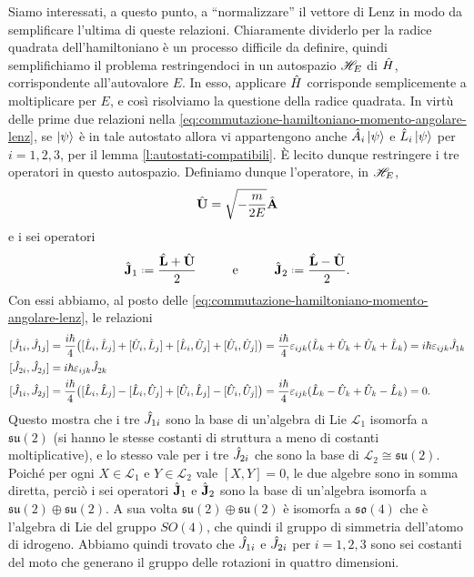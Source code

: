 Siamo interessati, a questo punto, a ``normalizzare'' il vettore di Lenz in modo da semplificare l'ultima di queste relazioni.
Chiaramente dividerlo per la radice quadrata dell'hamiltoniano è un processo difficile da definire, quindi semplifichiamo il problema restringendoci in un autospazio $\mathscr H_E$ di $\hat{H}$, corrispondente all'autovalore $E$.
In esso, applicare $\hat{H}$ corrisponde semplicemente a moltiplicare per $E$, e cos\`i risolviamo la questione della radice quadrata.
In virtù delle prime due relazioni nella \eqref{eq:commutazione-hamiltoniano-momento-angolare-lenz}, se $\left|{\psi}\right\rangle$ è in tale autostato allora vi appartengono anche $\hat{A}_i\left|{\psi}\right\rangle$ e $\hat{L}_i\left|{\psi}\right\rangle$ per $i=1,2,3$, per il lemma \ref{l:autostati-compatibili}.
È lecito dunque restringere i tre operatori in questo autospazio.
Definiamo dunque l'operatore, in $\mathscr H_E$,
\begin{equation}
	\hat{\mathbf{U}}=\sqrt{-\frac{m}{2E}}\hat{\mathbf{A}}
\end{equation}
e i sei operatori
\begin{equation}
	\op{\vec J}_1\defeq\frac{\op{\vec L}+\op{\vec U}}2\hspace{1cm}\text{e}\hspace{1cm}\op{\vec J}_2\defeq\frac{\op{\vec L}-\op{\vec U}}2.
	\label{eq:momento-angolare-SO4}
\end{equation}
Con essi abbiamo, al posto delle \eqref{eq:commutazione-hamiltoniano-momento-angolare-lenz}, le relazioni
\begin{equation}
	\begin{aligned}
		[\op J_{1i},\op J_{1j}]&=
			\frac{i\hbar}4\big([\op L_i,\op L_j]+[\op U_i,\op L_j]+[\op L_i,\op U_j]+[\op U_i,\op U_j]\big)=
			\frac{i\hbar}4\epsilon_{ijk}(\op L_k+\op U_k+\op U_k+\op L_k)=
			i\hbar\epsilon_{ijk}\op J_{1k}\\
		[\op J_{2i},\op J_{2j}]&=
			i\hbar\epsilon_{ijk}\op J_{2k}\\
		[\op J_{1i},\op J_{2j}]&=
			\frac{i\hbar}4\big([\op L_i,\op L_j]-[\op L_i,\op U_j]+[\op U_i,\op L_j]-[\op U_i,\op U_j]\big)=
			\frac{i\hbar}4\epsilon_{ijk}(\op L_k-\op U_k+\op U_k-\op L_k)=
			0.
	\end{aligned}
\end{equation}
Questo mostra che i tre $\hat{J}_{1i}$ sono la base di un'algebra di Lie $\mathscr L_1$ isomorfa a $\mathfrak{su}(2)$ (si hanno le stesse costanti di struttura a meno di costanti moltiplicative), e lo stesso vale per i tre $\hat{J}_{2i}$ che sono la base di $\mathscr L_2\cong\mathfrak{su}(2)$.
Poich\'e per ogni $X\in\mathscr L_1$ e $Y\in\mathscr L_2$ vale $[X,Y]=0$, le due algebre sono in somma diretta, perciò i sei operatori $\hat{\mathbf{J}}_1$ e $\hat{\mathbf{J}}_2$ sono la base di un'algebra isomorfa a $\mathfrak{su}(2)\oplus\mathfrak{su}(2)$.
A sua volta $\mathfrak{su}(2)\oplus\mathfrak{su}(2)$ è isomorfa a $\mathfrak{so}(4)$ che è l'algebra di Lie del gruppo $SO(4)$, che quindi il gruppo di simmetria dell'atomo di idrogeno.
Abbiamo quindi trovato che $\hat{J}_{1i}$ e $\hat{J}_{2i}$ per $i=1,2,3$ sono sei costanti del moto che generano il gruppo delle rotazioni in quattro dimensioni.


